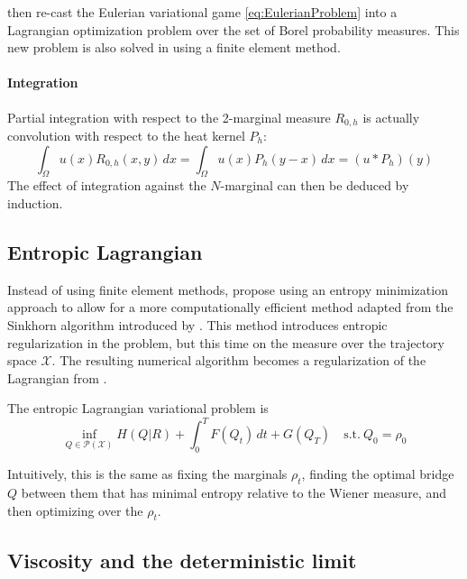 \documentclass[11pt]{article}
\newcommand{\calP}{\mathcal{P}}
\newcommand{\calX}{\mathcal{X}}
\newcommand{\suchthat}{\mathrm{s.t.}}
\numberwithin{equation}{section}
\theoremstyle{definition}
\begin{document}
\textcite{benamou:hal-01295299,benamou2015lagrangian} then re-cast the Eulerian variational game \eqref{eq:EulerianProblem} into a Lagrangian optimization problem over the set of Borel probability measures. This new problem is also solved in \cite{benamou:hal-01295299} using a finite element method.

\paragraph{Integration} Partial integration with respect to the 2-marginal measure $R_{0,h}$ is actually convolution with respect to the heat kernel $P_h$:
\[
	\int_\Omega u(x) R_{0,h}(x,y)\,dx =
	\int_\Omega u(x) P_h(y-x)\,dx =
	(u * P_h)(y)
\]
The effect of integration against the $N$-marginal can then be deduced by induction.

\subsection{Entropic Lagrangian}

Instead of using finite element methods, \textcite{benamou2018entropy} propose using an entropy minimization approach to allow for a more computationally efficient method adapted from the Sinkhorn algorithm introduced by \textcite{cuturi2013sinkhorn}.
This method introduces entropic regularization in the problem, but this time on the measure over the trajectory space $\calX$. The resulting numerical algorithm becomes a regularization of the Lagrangian from \cite{benamou:hal-01295299,benamou2015lagrangian}.

The entropic Lagrangian variational problem is
\begin{equation}\label{eq:EntropyLagrangianProblem}
\inf_{Q\in\calP(\calX)}
H(Q|R) + \int_0^T F(Q_t)\,dt + G(Q_T) \quad
\suchthat\ Q_0 = \rho_0
\end{equation}

Intuitively, this is the same as fixing the marginals $\rho_t$, finding the optimal bridge $Q$ between them that has minimal entropy relative to the Wiener measure, and then optimizing over the $\rho_t$.


\subsection{Viscosity and the deterministic limit}
\end{document}

